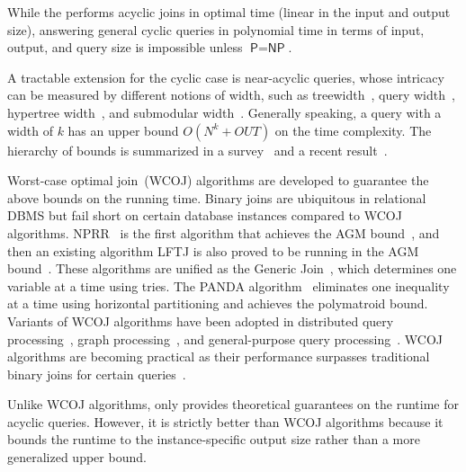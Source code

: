 While the \YannAlg performs acyclic joins in optimal time (linear in the input and output size), answering general cyclic queries in polynomial time in terms of input, output, and query size is impossible unless $\textsf{P}=\textsf{NP}$.

A tractable extension for the cyclic case is near-acyclic queries, whose intricacy can be measured by different notions of width, such as treewidth~\cite{ROBERTSON1986309}, 
query width~\cite{chandra1997}, hypertree width~\cite{gottlob1999}, and submodular width~\cite{Marx10}. Generally speaking, a query with a width of $k$ has an upper bound $O(N^k+OUT)$ on the time complexity.
The hierarchy of bounds is summarized in a survey~\cite{suciu2023} and a recent result~\cite{lpnorm2024}.

Worst-case optimal join~(WCOJ) algorithms are developed to guarantee the above bounds on the running time. Binary joins are ubiquitous in relational DBMS but fail short on certain database instances compared to WCOJ algorithms. NPRR~\cite{nprr12} is the first algorithm that achieves the AGM bound~\cite{agm08}, and then an existing algorithm LFTJ is also proved to be running in the AGM bound~\cite{2014leapfrog}. These algorithms are unified as the Generic Join~\cite{ngo2014SIGMOD,ngo2018}, which determines one variable at a time using tries. The PANDA algorithm~\cite{panda2017,panda2024} eliminates one inequality at a time using horizontal partitioning and achieves the polymatroid bound. Variants of WCOJ algorithms have been adopted in distributed query processing~\cite{chu2015theory, koutris2016worst, ammar2018distributed}, graph  processing~\cite{zhang2014evaluating, aberger2017emptyheaded, ammar2018distributed, hogan2019worst, mhedhbi2019optimizing, zhu2019hymj}, and general-purpose query processing~\cite{aref2015design, aberger2018levelheaded,2020hashtrie}. WCOJ algorithms are becoming practical as their performance surpasses traditional binary joins for certain queries~\cite{freejoin2023}.

Unlike WCOJ algorithms, \RPT only provides theoretical guarantees on the runtime for acyclic queries. However, it is strictly better than WCOJ algorithms because it bounds the runtime to the instance-specific output size rather than a more generalized upper bound. 
